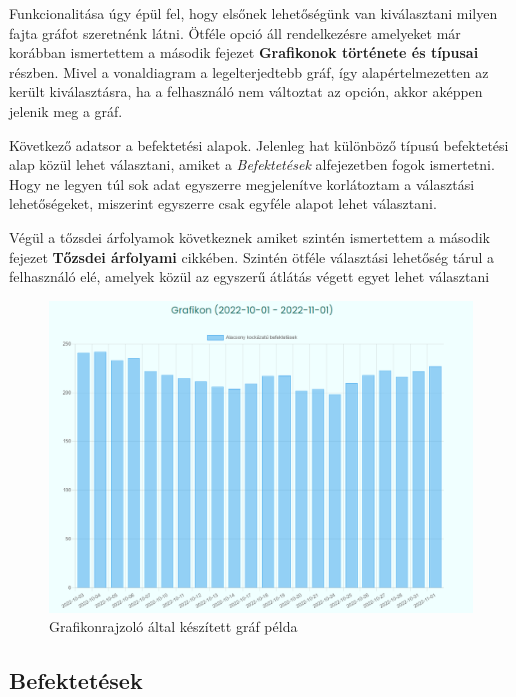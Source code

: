 	Funkcionalitása úgy épül fel, hogy elsőnek lehetőségünk van kiválasztani milyen fajta gráfot szeretnénk látni. Ötféle opció áll rendelkezésre amelyeket már korábban ismertettem a második fejezet \textbf{Grafikonok története és típusai} részben. Mivel a vonaldiagram a legelterjedtebb gráf, így alapértelmezetten az került kiválasztásra, ha a felhasználó nem változtat az opción, akkor aképpen jelenik meg a gráf. 

Következő adatsor a befektetési alapok. Jelenleg hat különböző típusú befektetési alap közül lehet választani, amiket a \emph{Befektetések} alfejezetben fogok ismertetni. Hogy ne legyen túl sok adat egyszerre megjelenítve korlátoztam a választási lehetőségeket, miszerint egyszerre csak egyféle alapot lehet választani. 

Végül a tőzsdei árfolyamok következnek amiket szintén ismertettem a második fejezet  \textbf{Tőzsdei árfolyami} cikkében. Szintén ötféle választási lehetőség tárul a felhasználó elé, amelyek közül az egyszerű átlátás végett egyet lehet választani

\begin{figure}[h]
\centering
\includegraphics[scale=0.4]{images/graphPlotter.png}
\caption{Grafikonrajzoló által készített gráf példa}
\end{figure}

\subsection{Befektetések}

